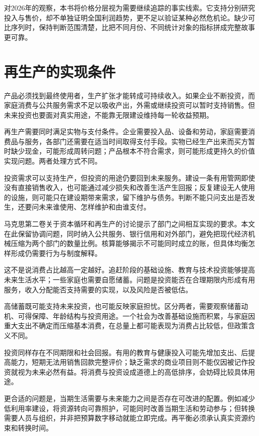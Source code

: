 \documentclass[UTF8,fontset=fandol,zihao=-4,oneside,openany]{ctexbook}
\begin{document}
对2026年的观察，本书将价格分层视为需要继续追踪的事实线索。它支持分别研究投入与售价，却不单独证明全国利润趋势，更不足以验证某种必然危机论。缺少可比序列时，保持判断范围清楚，比把不同月份、不同统计对象的指标拼成完整故事更可靠。

\section{再生产的实现条件}
产品必须找到最终使用者，生产扩张才能转成可持续收入。如果企业不断投资，而家庭消费与公共服务需求不足以吸收产出，外需或继续投资可以暂时支持销售。但未来投资也要面对真实用途，不能靠无限建设维持每一轮收益预期。

\label{arg:P229}
再生产需要同时满足实物与支付条件。企业需要投入品、设备和劳动，家庭需要消费品与服务，各部门还需要在适当时间取得支付手段。实物已经生产出来而买方暂时缺少现金，可能形成周转问题；产品根本不符合需求，则可能形成更持久的价值实现问题。两者处理方式不同。

投资需求可以支持生产，但投资的用途仍要回到未来服务。建设一条有用管网即使没有直接销售收入，也可能通过减少损失和改善生活产生回报；反复建设无人使用的设施，则可能只在建设期带来需求，留下维护与债务。判断不能只问支出是否发生，还要问未来谁使用、怎样维护和由谁支付。

马克思第二卷关于资本循环和再生产的讨论提示了部门之间相互实现的要求。本文在此保留协调问题，同时纳入公共服务、银行信用和对外部门，避免把现代经济机械压缩为两个部门的数量比例。核算能够揭示不可能同时成立的账，但具体均衡怎样形成仍需要行为与制度解释。\cite{Marx2}

这不是说消费占比越高一定越好。追赶阶段的基础设施、教育与技术投资能够提高未来生活水平；一些家庭也需要自愿储蓄。问题是投资能否在合理期限内形成有用服务，收入分配能否支持需要的实现，以及风险是否被低估。

\label{arg:P230}
高储蓄既可能支持未来投资，也可能反映家庭担忧。区分两者，需要观察储蓄动机、可得保障、年龄结构与投资用途。一个社会为改善基础设施而积累，与家庭因重大支出不确定而压缩基本消费，在总量上都可能表现为消费占比较低，但政策含义不同。

投资同样存在不同期限和社会回报。有用的教育与健康投入可能先增加支出、后提高能力，短期无法用销售回款完整评价；缺乏需求的商业项目则不能仅因被记作投资就视为未来必然有益。将消费与投资设成道德上的高低排序，会妨碍比较具体用途。

更合适的问题是，当期生活需要与未来能力之间是否存在可改进的配置。例如减少低利用率建设，将资源转向可靠照护，可能同时改善当期生活和劳动参与；但转换需要人员与组织，并非把预算数字移动就能立即完成。再平衡必须承认真实资源约束和转换时间。
\end{document}
